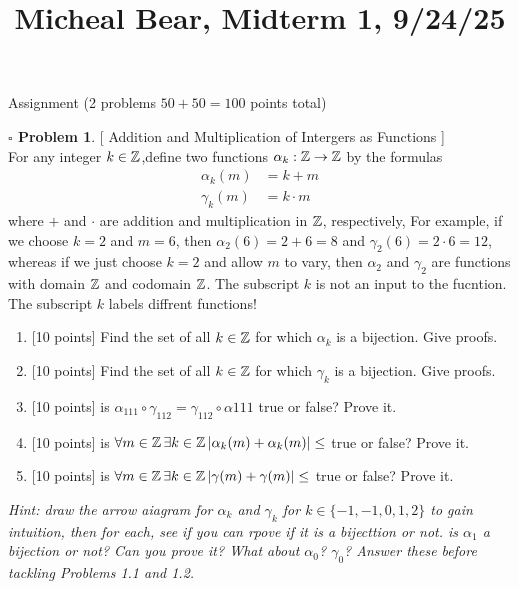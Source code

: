 \documentclass[11pt,twoside]{amsart}
\title {Micheal Bear, Midterm 1, 9/24/25}
\theoremstyle{definition}
\newtheorem{bprob}{$\square$ Problem}
\begin{document}
	\maketitle	

Assignment (2 problems $50 + 50 = 100$ points total)

\begin{bprob} %
  {[ Addition and Multiplication of Intergers as Functions ]} \\
  For any integer $k \in \operatorname*{\mathbb{Z}}$,define two functions $\alpha_k: \operatorname*{\mathbb{Z}} \to \operatorname*{\mathbb{Z}}$ by the formulas 
    \begin{align*}
      \alpha_k(m) &= k + m \\
      \gamma_k(m) &= k \cdot m
    \end{align*}
 where $+$ and $\cdot$ are addition and multiplication in $\operatorname*{\mathbb{Z}}$, respectively, For example, if we choose $k = 2$ and $m = 6$, then $\alpha_2(6) = 2+6=8$ and $\gamma_2(6) = 2 \cdot 6 = 12$, whereas if we just choose $k = 2$ and allow $m$ to vary, then $\alpha_2$ and $\gamma_2$ are functions with domain $\operatorname*{\mathbb{Z}}$ and codomain $\operatorname*{\mathbb{Z}}$. The subscript $k$ is not an input to the fucntion. The subscript $k$ labels diffrent functions!
    \begin{enumerate}[label= 1.\arabic*, itemsep=0.1cm]
        \item %
          {[10 points]} Find the set of all $k \in \operatorname*{\mathbb{Z}}$ for which $\alpha_k$ is a bijection. Give proofs.
        \item %
          {[10 points]} Find the set of all $k \in \operatorname*{\mathbb{Z}}$ for which $\gamma_k$ is a bijection. Give proofs.
        \item %
          {[10 points]} is $\alpha_{111} \circ \gamma_{112} = \gamma_{112} \circ \alpha{111}$ true or false? Prove it.
        \item %
          {[10 points]} is $\forall m \in \operatorname*{\mathbb{Z}} \exists k \in \operatorname*{\mathbb{Z}} | \alpha_k(m) + \alpha_k(m)| \leq$ true or false? Prove it.
        \item %
          {[10 points]} is $\forall m \in \operatorname*{\mathbb{Z}} \exists k \in \operatorname*{\mathbb{Z}} | \gamma(m) + \gamma(m)| \leq$ true or false? Prove it.

    \end{enumerate}
\end{bprob}
\textit{Hint: draw the arrow aiagram for $\alpha_k$ and $\gamma_k$ for $k \in \{ -1, -1, 0, 1, 2 \}$ to gain intuition, then for each, see if you can rpove if it is a bijecttion or not. is $\alpha_1$ a bijection or not? Can you prove it? What about $\alpha_0$? $\gamma_0$? Answer these before tackling Problems 1.1 and 1.2.} \medskip \\
\end{document}

